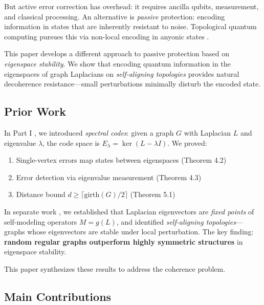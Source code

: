 \documentclass[11pt,a4paper]{article}
\theoremstyle{definition}
\newcommand{\gmark}{\mathrm{girth}}
\begin{document}
But active error correction has overhead: it requires ancilla qubits, measurement, and classical processing. An alternative is \emph{passive} protection: encoding information in states that are inherently resistant to noise. Topological quantum computing pursues this via non-local encoding in anyonic states \cite{kitaev2003fault}.

This paper develops a different approach to passive protection based on \emph{eigenspace stability}. We show that encoding quantum information in the eigenspaces of graph Laplacians on \emph{self-aligning topologies} provides natural decoherence resistance---small perturbations minimally disturb the encoded state.

\subsection{Prior Work}

In Part I \cite{benshalom2026spectral}, we introduced \emph{spectral codes}: given a graph $G$ with Laplacian $L$ and eigenvalue $\lambda$, the code space is $E_\lambda = \ker(L - \lambda I)$. We proved:
\begin{enumerate}[noitemsep]
    \item Single-vertex errors map states between eigenspaces (Theorem 4.2)
    \item Error detection via eigenvalue measurement (Theorem 4.3)
    \item Distance bound $d \geq \lceil \gmark(G)/2 \rceil$ (Theorem 5.1)
\end{enumerate}

In separate work \cite{benshalom2026selfaligning}, we established that Laplacian eigenvectors are \emph{fixed points} of self-modeling operators $M = g(L)$, and identified \emph{self-aligning topologies}---graphs whose eigenvectors are stable under local perturbation. The key finding: \textbf{random regular graphs outperform highly symmetric structures} in eigenspace stability.

This paper synthesizes these results to address the coherence problem.

\subsection{Main Contributions}
\end{document}

